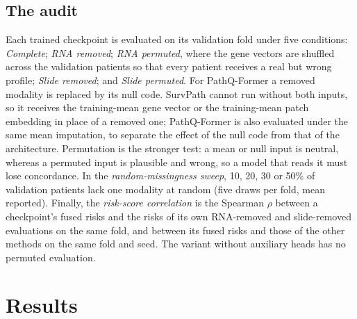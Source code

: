 \documentclass{article}
\newcommand{\pq}{PathQ-Former}
\begin{document}
\subsection{The audit}
\label{sec:audit-setup}
Each trained checkpoint is evaluated on its validation fold under five conditions: \emph{Complete}; \emph{RNA removed}; \emph{RNA permuted}, where the gene vectors are shuffled across the validation patients so that every patient receives a real but wrong profile; \emph{Slide removed}; and \emph{Slide permuted}. For \pq{} a removed modality is replaced by its null code. SurvPath cannot run without both inputs, so it receives the training-mean gene vector or the training-mean patch embedding in place of a removed one; \pq{} is also evaluated under the same mean imputation, to separate the effect of the null code from that of the architecture. Permutation is the stronger test: a mean or null input is neutral, whereas a permuted input is plausible and wrong, so a model that reads it must lose concordance. In the \emph{random-missingness sweep}, 10, 20, 30 or 50\% of validation patients lack one modality at random (five draws per fold, mean reported). Finally, the \emph{risk-score correlation} is the Spearman $\rho$ between a checkpoint's fused risks and the risks of its own RNA-removed and slide-removed evaluations on the same fold, and between its fused risks and those of the other methods on the same fold and seed. The variant without auxiliary heads has no permuted evaluation.

\section{Results}
\label{sec:results}
\end{document}
